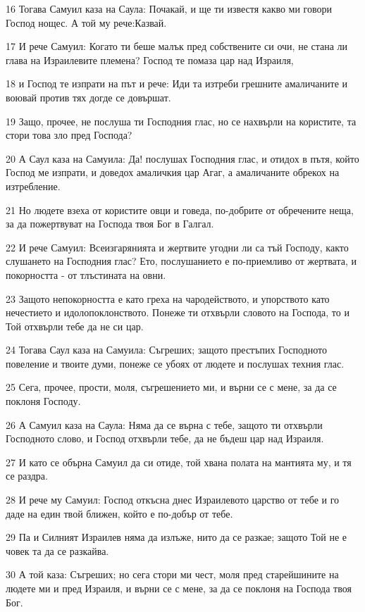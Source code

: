 \par 16 Тогава Самуил каза на Саула: Почакай, и ще ти известя какво ми говори Господ нощес. А той му рече:Казвай.
\par 17 И рече Самуил: Когато ти беше малък пред собствените си очи, не стана ли глава на Израилевите племена? Господ те помаза цар над Израиля,
\par 18 и Господ те изпрати на път и рече: Иди та изтреби грешните амаличаните и воювай против тях догде се довършат.
\par 19 Защо, прочее, не послуша ти Господния глас, но се нахвърли на користите, та стори това зло пред Господа?
\par 20 А Саул каза на Самуила: Да! послушах Господния глас, и отидох в пътя, който Господ ме изпрати, и доведох амаличкия цар Агаг, а амаличаните обрекох на изтребление.
\par 21 Но людете взеха от користите овци и говеда, по-добрите от обречените неща, за да пожертвуват на Господа твоя Бог в Галгал.
\par 22 И рече Самуил: Всеизгарянията и жертвите угодни ли са тъй Господу, както слушането на Господния глас? Ето, послушанието е по-приемливо от жертвата, и покорността - от тлъстината на овни.
\par 23 Защото непокорността е като греха на чародейството, и упорството като нечестието и идолопоклонството. Понеже ти отхвърли словото на Господа, то и Той отхвърли тебе да не си цар.
\par 24 Тогава Саул каза на Самуила: Съгреших; защото престъпих Господното повеление и твоите думи, понеже се убоях от людете и послушах техния глас.
\par 25 Сега, прочее, прости, моля, съгрешението ми, и върни се с мене, за да се поклоня Господу.
\par 26 А Самуил каза на Саула: Няма да се върна с тебе, защото ти отхвърли Господното слово, и Господ отхвърли тебе, да не бъдеш цар над Израиля.
\par 27 И като се обърна Самуил да си отиде, той хвана полата на мантията му, и тя се раздра.
\par 28 И рече му Самуил: Господ откъсна днес Израилевото царство от тебе и го даде на един твой ближен, който е по-добър от тебе.
\par 29 Па и Силният Израилев няма да излъже, нито да се разкае; защото Той не е човек та да се разкайва.
\par 30 А той каза: Съгреших; но сега стори ми чест, моля пред старейшините на людете ми и пред Израиля, и върни се с мене, за да се поклоня на Господа твоя Бог.
